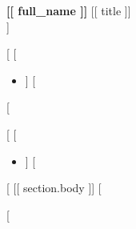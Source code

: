 \documentclass[9pt,a4paper]{article}
\begin{document}
\textbf{\Large [[ full_name ]]} \hfill [[ title ]]\\
[%
{\small [[ personal_details | join(" | ") ]]}
[%

\vspace{0.6em}
\hrule
\vspace{0.6em}

[%
[%
\Needspace*{4\baselineskip}
[%
\textbf{[[ section.title ]]}\\
[%
[%
[%
\textbf{[[ entry.headline ]]}[%
\nopagebreak
[%
[%
[[ entry.body ]]

[%
[%
\begin{itemize}
[%
  \item [[ highlight ]]
[%
\end{itemize}
[%

[%
[%
\begin{itemize}
[%
  \item [[ item ]]
[%
\end{itemize}
[%
{\small [[ section.body ]]}
[%

[%
\end{document}
